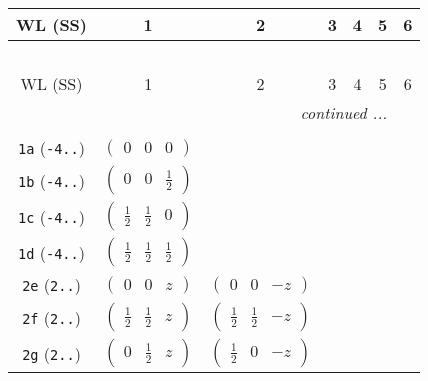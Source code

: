 \documentclass[fleqn,9pt,landscape]{jsarticle}
\begin{document}
\begin{center}
\renewcommand{\arraystretch}{1.2}
\begin{longtable}{ccccccc}
 \hline \hline
WL (SS) & 1 & 2 & 3 & 4 & 5 & 6 \\ \hline \endfirsthead

\multicolumn{6}{l}{\tablename\ \thetable{}} \\
 \hline \hline
WL (SS) & 1 & 2 & 3 & 4 & 5 & 6 \\ \hline \endhead

 \hline \hline
\multicolumn{6}{r}{\footnotesize\it continued ...} \\ \endfoot

 \hline \hline
\multicolumn{6}{r}{} \\ \endlastfoot

{\tt 1a} ({\tt -4..}) & $ \begin{pmatrix} 0 & 0 & 0 \end{pmatrix} $ & $  $ & $  $ & $  $ \\ \hline
{\tt 1b} ({\tt -4..}) & $ \begin{pmatrix} 0 & 0 & \frac{1}{2} \end{pmatrix} $ & $  $ & $  $ & $  $ \\ \hline
{\tt 1c} ({\tt -4..}) & $ \begin{pmatrix} \frac{1}{2} & \frac{1}{2} & 0 \end{pmatrix} $ & $  $ & $  $ & $  $ \\ \hline
{\tt 1d} ({\tt -4..}) & $ \begin{pmatrix} \frac{1}{2} & \frac{1}{2} & \frac{1}{2} \end{pmatrix} $ & $  $ & $  $ & $  $ \\ \hline
{\tt 2e} ({\tt 2..}) & $ \begin{pmatrix} 0 & 0 & z \end{pmatrix} $ & $ \begin{pmatrix} 0 & 0 & - z \end{pmatrix} $ & $  $ & $  $ \\ \hline
{\tt 2f} ({\tt 2..}) & $ \begin{pmatrix} \frac{1}{2} & \frac{1}{2} & z \end{pmatrix} $ & $ \begin{pmatrix} \frac{1}{2} & \frac{1}{2} & - z \end{pmatrix} $ & $  $ & $  $ \\ \hline
{\tt 2g} ({\tt 2..}) & $ \begin{pmatrix} 0 & \frac{1}{2} & z \end{pmatrix} $ & $ \begin{pmatrix} \frac{1}{2} & 0 & - z \end{pmatrix} $ & $  $ & $  $ \\ \hline

\end{longtable}
\end{center}
\end{document}
